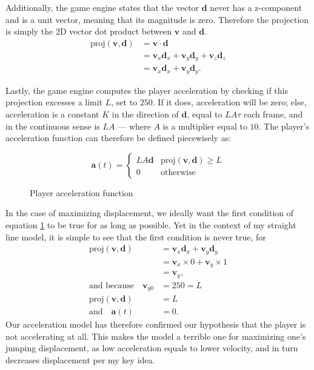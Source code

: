 \documentclass[a4paper,12pt]{article}
\newcommand{\tvec}[1]{\boldsymbol{#1}}
\newcommand{\td}{\tvec{d}}
\newcommand{\ta}{\tvec{a}}
\newcommand{\tv}{\tvec{v}}
\begin{document}
Additionally, the game engine states that the vector $\td$ never has a z-component and is a unit vector, meaning that its magnitude is zero. Therefore the projection is simply the 2D vector dot product between $\tv$ and $\td$.
\begin{align*}
    \text{proj}(\tv, \td) &= \tv \cdot \td\\
    &= \tv_x \td_x + \tv_y \td_y + \tv_z \td_z\\
    &= \tv_x \td_x + \tv_y \td_y.
\end{align*}

Lastly, the game engine computes the player acceleration by checking if this projection excesses a limit $L$, set to $250$. If it does, acceleration will be zero; else, acceleration is a constant $K$ in the direction of $\td$, equal to $LA\tau$ each frame, and in the continuous sense is $LA$ --- where $A$ is a multiplier equal to $10$. The player's acceleration function can therefore be defined piecewisely as:
\begin{figure}[H]
    \centering
    \[
        \ta(t) = \begin{cases}
            LA \td & \text{proj}(\tv, \td) \ge L\\
            0 & \text{otherwise}
        \end{cases}
    \]
    \label{eq:playeracceleration}
    \caption{Player acceleration function}
\end{figure}

In the case of maximizing displacement, we ideally want the first condition of equation \ref{eq:playeracceleration} to be true for as long as possible. Yet in the context of my straight line model, it is simple to see that the first condition is never true, for
\begin{align*}
    \text{proj}(\tv, \td) &= \tv_x \td_x + \tv_y \td_y\\
    &= \tv_x \times 0 + \tv_y \times 1\\
    &= \tv_y,\\
    \text{and because} \quad \tv_{y0} &= 250 = L\\
    \text{proj}(\tv, \td) &= L\\
    \text{and} \quad \ta(t) &= 0.
\end{align*}
Our acceleration model has therefore confirmed our hypothesis that the player is not accelerating at all. This makes the model a terrible one for maximizing one's jumping displacement, as low acceleration equals to lower velocity, and in turn decreases displacement per my key idea.
\end{document}
